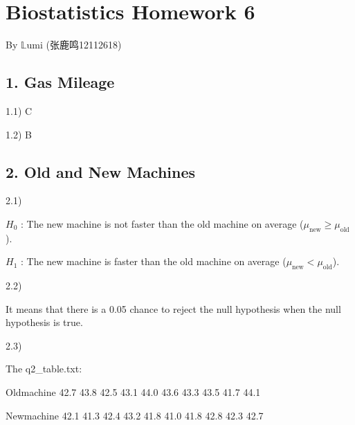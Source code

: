 \documentclass[
]{article}
\author{}
\date{\vspace{-2.5em}}
\begin{document}
\hypertarget{biostatistics-homework-6}{%
\section{Biostatistics Homework 6}\label{biostatistics-homework-6}}

By \(\mathbb{L}\)umi (张鹿鸣12112618)

\vspace{5mm}

\hypertarget{gas-mileage}{%
\subsection{1. Gas Mileage}\label{gas-mileage}}

1.1) C

1.2) B

\hypertarget{old-and-new-machines}{%
\subsection{2. Old and New Machines}\label{old-and-new-machines}}

2.1)

\(H_0\) : The new machine is not faster than the old machine on average
(\(\mu_\text{new} \geq \mu_\text{old}\)).

\(H_1\) : The new machine is faster than the old machine on average
(\(\mu_\text{new} < \mu_\text{old}\)).

2.2)

It means that there is a 0.05 chance to reject the null hypothesis when
the null hypothesis is true.

2.3)

The q2\_table.txt:

Oldmachine 42.7 43.8 42.5 43.1 44.0 43.6 43.3 43.5 41.7 44.1

Newmachine 42.1 41.3 42.4 43.2 41.8 41.0 41.8 42.8 42.3 42.7
\end{document}
